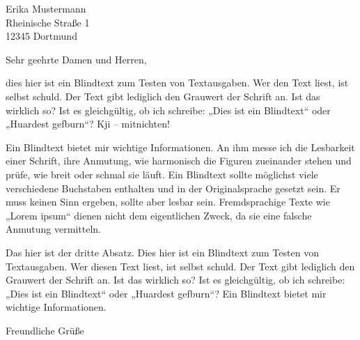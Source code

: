 \documentclass[version=last, Briefvorlage]{scrlttr2}
\begin{document}
%
\begin{letter}{%
		Erika Mustermann\\
		Rheinische Straße 1\\
		12345 Dortmund%
	}
	\opening{Sehr geehrte Damen und Herren,}
	dies hier ist ein Blindtext zum Testen von Textausgaben. Wer den Text liest,
	ist selbst schuld. Der Text gibt lediglich den Grauwert der Schrift an. Ist das
	wirklich so? Ist es gleichgültig, ob ich schreibe: „Dies ist ein Blindtext“ oder
	„Huardest gefburn“? Kji – mitnichten!
	
	Ein Blindtext bietet mir wichtige Informationen.
	An ihm messe ich die Lesbarkeit einer Schrift, ihre Anmutung, wie
	harmonisch die Figuren zueinander stehen und prüfe, wie breit oder schmal
	sie läuft. Ein Blindtext sollte möglichst viele verschiedene Buchstaben enthalten
	und in der Originalsprache gesetzt sein. Er muss keinen Sinn ergeben,
	sollte aber lesbar sein. Fremdsprachige Texte wie „Lorem ipsum“ dienen nicht
	dem eigentlichen Zweck, da sie eine falsche Anmutung vermitteln.
	
	Das hier ist der dritte Absatz. Dies hier ist ein Blindtext zum Testen von Textausgaben.
	Wer diesen Text liest, ist selbst schuld. Der Text gibt lediglich den
	Grauwert der Schrift an. Ist das wirklich so? Ist es gleichgültig, ob ich schreibe:
	„Dies ist ein Blindtext“ oder „Huardest gefburn“? 
	Ein Blindtext bietet mir wichtige Informationen.
	\closing{Freundliche Grüße}
\end{letter}
%
\end{document}
